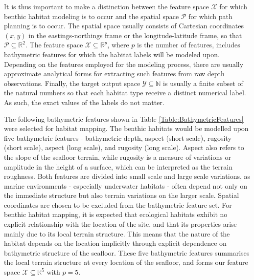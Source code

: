 		It is thus important to make a distinction between the feature space $\mathcal{X}$ for which benthic habitat modeling is to occur and the spatial space $\mathcal{P}$ for which path planning is to occur. The spatial space usually consists of Cartesian coordinates $(x, y)$ in the eastings-northings frame or the longitude-latitude frame, so that $\mathcal{P} \subseteq \mathbb{R}^{2}$. The feature space $\mathcal{X} \subseteq \mathbb{R}^{p}$, where $p$ is the number of features, includes bathymetric features for which the habitat labels will be modeled upon. Depending on the features employed for the modeling process, there are usually approximate analytical forms for extracting such features from raw depth observations. Finally, the target output space $\mathcal{Y} \subseteq \mathbb{N}$ is usually a finite subset of the natural numbers so that each habitat type receive a distinct numerical label. As such, the exact values of the labels do not matter. 
		
		The following bathymetric features shown in Table \ref{Table:BathymetricFeatures} were selected for habitat mapping. The benthic habitats would be modelled upon five bathymetric features - bathymetric depth, aspect (short scale), rugosity (short scale), aspect (long scale), and rugosity (long scale). Aspect also refers to the slope of the seafloor terrain, while rugosity is a measure of variations or amplitude in the height of a surface, which can be interpreted as the terrain roughness. Both features are divided into small scale and large scale variations, as marine environments - especially underwater habitats - often depend not only on the immediate structure but also terrain variations on the larger scale. Spatial coordinates are chosen to be excluded from the bathymetric feature set. For benthic habitat mapping, it is expected that ecological habitats exhibit no explicit relationship with the location of the site, and that its properties arise mainly due to its local terrain structure. This means that the nature of the habitat depends on the location implicitly through explicit dependence on bathymetric structure of the seafloor. These five bathymetric features summarises the local terrain structure at every location of the seafloor, and forms our feature space $\mathcal{X} \subseteq \mathbb{R}^{5}$ with $p = 5$. 
		
